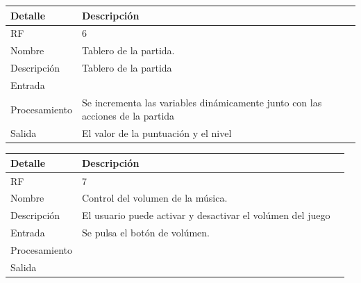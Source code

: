 \documentclass{article}
\begin{document}
\begin{table}[H]
  \begin{center}
    \begin{tabularx}{\linewidth}{|X|X|X|} %
      \hline
      \textbf{Detalle} & \textbf{Descripción}\\
      \hline
      RF & 6 \\
      \hline
      Nombre & Tablero de la partida.\\
      \hline
      Descripción & Tablero de la partida\\
      \hline
      Entrada & \\
      \hline
      Procesamiento & Se incrementa las variables dinámicamente junto con las acciones de la partida\\
      \hline
      Salida & El valor de la puntuación y el nivel\\
      \hline
    \end{tabularx}
  \end{center}
\end{table}

\begin{table}[H]
  \begin{center}
    \begin{tabularx}{\linewidth}{|X|X|X|} %
      \hline
      \textbf{Detalle} & \textbf{Descripción}\\
      \hline
      RF & 7 \\
      \hline
      Nombre & Control del volumen de la música.\\
      \hline
      Descripción & El usuario puede activar y desactivar el volúmen del juego\\
      \hline
      Entrada & Se pulsa el botón de volúmen.\\
      \hline
      Procesamiento & \\
      \hline
      Salida & \\
      \hline
    \end{tabularx}
  \end{center}
\end{table}
\end{document}

